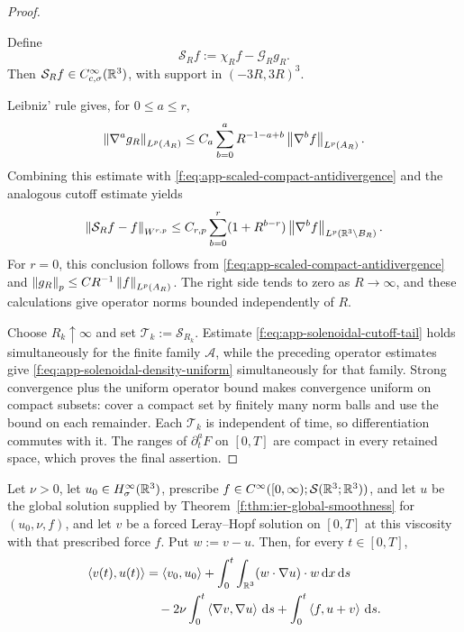 \begin{proof}
\begin{samepage}
Define
\[
 \mathcal S_Rf:=\chi_Rf-\mathcal G_Rg_R.
\]
Then \(\mathcal S_Rf\in C_{c,\sigma}^\infty(\mathbb R^3)\), with support in
\((-3R,3R)^3\).
\end{samepage}
Leibniz' rule gives, for \(0\le a\le r\),
\[
 \left\lVert \nabla^ag_R\right\rVert_{L^p(A_R)}
 \le C_a\sum_{b=0}^{a}
 R^{-1-a+b}\left\lVert \nabla^bf\right\rVert_{L^p(A_R)}.
\]
Combining this estimate with
\eqref{f:eq:app-scaled-compact-antidivergence} and the analogous cutoff
estimate yields
\begin{equation}
 \left\lVert \mathcal S_Rf-f\right\rVert_{W^{r,p}}
 \le C_{r,p}\sum_{b=0}^{r}
 (1+R^{b-r})\left\lVert \nabla^bf\right\rVert_{L^p(\mathbb R^3\setminus B_R)}.
 \label{f:eq:app-solenoidal-cutoff-tail}
\end{equation}
For \(r=0\), this conclusion follows from
\eqref{f:eq:app-scaled-compact-antidivergence} and
\(\left\lVert g_R\right\rVert_p\le C R^{-1}\left\lVert f\right\rVert_{L^p(A_R)}\).
The right side tends to zero as \(R\to\infty\), and these calculations
give operator norms bounded independently of \(R\).

Choose \(R_k\uparrow\infty\) and set
\(\mathcal T_k:=\mathcal S_{R_k}\).  Estimate
\eqref{f:eq:app-solenoidal-cutoff-tail} holds simultaneously for the finite
family \(\mathscr A\), while the preceding operator estimates give
\eqref{f:eq:app-solenoidal-density-uniform} simultaneously for that family.
Strong convergence plus the uniform operator bound makes convergence
uniform on compact subsets: cover a compact set by finitely many norm balls
and use the bound on each remainder.  Each \(\mathcal T_k\) is independent
of time, so differentiation commutes with it.  The ranges of
\(\partial_t^aF\) on \([0,T]\) are compact in every retained space, which
proves the final assertion.
\end{proof}

\begin{lemma}
\label{f:lem:app-cross-energy}
Let \(\nu>0\), let \(u_0\in H^\infty_\sigma(\mathbb R^3)\), prescribe
\(f\in C^\infty([0,\infty);\mathcal S(\mathbb R^3;\mathbb R^3))\), and let \(u\) be the
global solution supplied by
Theorem~\ref{f:thm:ier-global-smoothness} for \((u_0,\nu,f)\), and let \(v\)
be a forced Leray--Hopf solution on \([0,T]\) at this viscosity with that prescribed force \(f\).  Put \(w:=v-u\).  Then, for every
\(t\in[0,T]\),
\begin{align}
 \left\langle v(t),u(t)\right\rangle
 &=
 \left\langle v_0,u_0\right\rangle
 +\int_0^t\int_{\mathbb R^3}
       (w\cdot\nabla u)\cdot w\,\mathrm d x\,\mathrm d s
 \notag\\
 &\quad
 -2\nu\int_0^t\left\langle \nabla v,\nabla u\right\rangle\,\mathrm d s
 +\int_0^t\left\langle f,u+v\right\rangle\,\mathrm d s.
 \label{f:eq:app-cross-energy}
\end{align}
\end{lemma}

